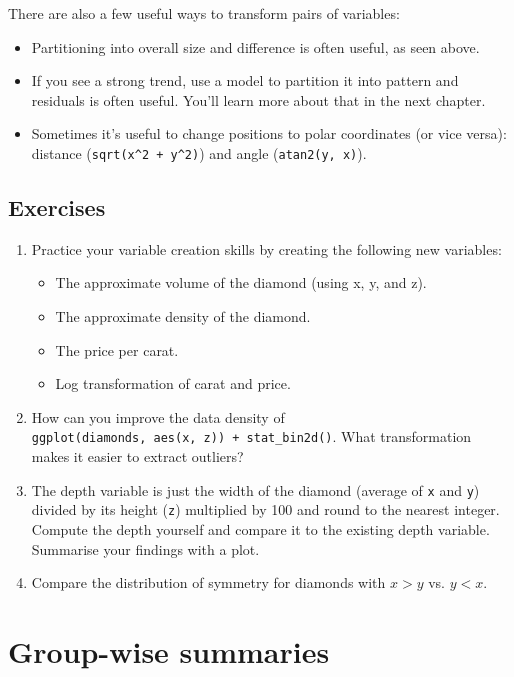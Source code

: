 There are also a few useful ways to transform pairs of variables:

\begin{itemize}
\item
  Partitioning into overall size and difference is often useful, as seen
  above.
\item
  If you see a strong trend, use a model to partition it into pattern
  and residuals is often useful. You'll learn more about that in the
  next chapter.
\item
  Sometimes it's useful to change positions to polar coordinates (or
  vice versa): distance (\texttt{sqrt(x\^{}2\ +\ y\^{}2)}) and angle
  (\texttt{atan2(y,\ x)}).
\end{itemize}

\subsection{Exercises}

\begin{enumerate}
\def\labelenumi{\arabic{enumi}.}
\item
  Practice your variable creation skills by creating the following new
  variables:

  \begin{itemize}
  \tightlist
  \item
    The approximate volume of the diamond (using x, y, and z).
  \item
    The approximate density of the diamond.
  \item
    The price per carat.
  \item
    Log transformation of carat and price.
  \end{itemize}
\item
  How can you improve the data density of
  \texttt{ggplot(diamonds,\ aes(x,\ z))\ +\ stat\_bin2d()}. What
  transformation makes it easier to extract outliers?
\item
  The depth variable is just the width of the diamond (average of
  \texttt{x} and \texttt{y}) divided by its height (\texttt{z})
  multiplied by 100 and round to the nearest integer. Compute the depth
  yourself and compare it to the existing depth variable. Summarise your
  findings with a plot.
\item
  Compare the distribution of symmetry for diamonds with \(x > y\) vs.
  \(y < x\).
\end{enumerate}

\section{Group-wise summaries}\label{sec:summarise}

